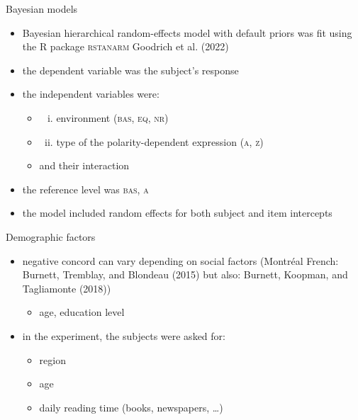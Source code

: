 \documentclass[
  ignorenonframetext,
]{beamer}
\providecommand{\tightlist}{%
  \setlength{\itemsep}{0pt}\setlength{\parskip}{0pt}}\usepackage{longtable,booktabs,array}
\begin{document}
\begin{frame}
\begin{block}{Bayesian models}
\protect\hypertarget{bayesian-models}{}
\begin{itemize}
\tightlist
\item
  Bayesian hierarchical random-effects model with default priors was fit
  using the R package \textsc{rstanarm} Goodrich et al. (2022)
\item
  the dependent variable was the subject's response
\item
  the independent variables were:

  \begin{itemize}
  \item
    \begin{enumerate}
    [(i)]
    \tightlist
    \item
      environment (\textsc{bas, eq, nr})
    \end{enumerate}
  \item
    \begin{enumerate}
    [(i)]
    \setcounter{enumi}{1}
    \tightlist
    \item
      type of the polarity-dependent expression (\textsc{a, z})
    \end{enumerate}
  \item
    and their interaction
  \end{itemize}
\item
  the reference level was \textsc{bas, a}
\item
  the model included random effects for both subject and item intercepts
\end{itemize}
\end{block}
\end{frame}

\begin{frame}
\begin{block}{Demographic factors}
\protect\hypertarget{demographic-factors}{}
\begin{itemize}
\tightlist
\item
  negative concord can vary depending on social factors (Montréal
  French: Burnett, Tremblay, and Blondeau (2015) but also: Burnett,
  Koopman, and Tagliamonte (2018))

  \begin{itemize}
  \tightlist
  \item
    age, education level
  \end{itemize}
\item
  in the experiment, the subjects were asked for:

  \begin{itemize}
  \tightlist
  \item
    region
  \item
    age
  \item
    daily reading time (books, newspapers, \ldots)
  \end{itemize}
\end{itemize}
\end{block}
\end{frame}
\end{document}
